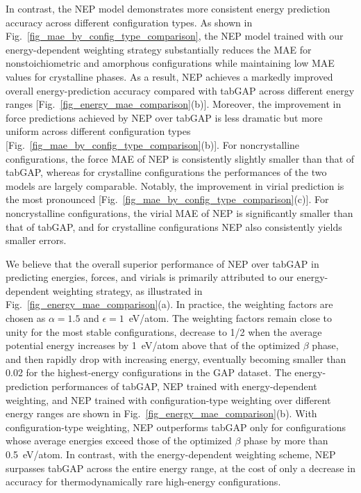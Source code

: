 \documentclass[aip,graphicx,amsmath,amssymb]{revtex4-1}
\begin{document}
In contrast, the NEP model demonstrates more consistent energy prediction accuracy
across different configuration types.
As shown in Fig.~\ref{fig_mae_by_config_type_comparison}, the NEP model trained with our 
energy-dependent weighting strategy 
substantially reduces the MAE for nonstoichiometric and amorphous
configurations while maintaining low MAE values for crystalline phases.
As a result, NEP achieves a markedly improved overall energy-prediction accuracy compared with
tabGAP across different energy ranges
[Fig.~\ref{fig_energy_mae_comparison}(b)].
Moreover, the improvement in force predictions achieved by NEP over tabGAP is less dramatic
but more uniform across different configuration types
[Fig.~\ref{fig_mae_by_config_type_comparison}(b)].
For noncrystalline configurations, the force MAE of NEP is consistently slightly smaller
than that of tabGAP, whereas for crystalline configurations the performances of the two
models are largely comparable.
Notably, the improvement in virial prediction is the most pronounced
[Fig.~\ref{fig_mae_by_config_type_comparison}(c)].
For noncrystalline configurations, the virial MAE of NEP is significantly smaller than that
of tabGAP, and for crystalline configurations NEP also consistently yields smaller errors.

We believe that the overall superior performance of NEP over tabGAP in predicting energies,
forces, and virials is primarily attributed to our energy-dependent weighting strategy,
as illustrated in Fig.~\ref{fig_energy_mae_comparison}(a).
In practice, the weighting factors are chosen as $\alpha = 1.5$ and $\epsilon = 1$~eV/atom.
The weighting factors remain close to unity for the most stable configurations, decrease
to 1/2 when the average potential energy increases by 1~eV/atom above that of the
optimized $\beta$ phase, and then rapidly drop with increasing energy, eventually becoming
smaller than 0.02 for the highest-energy configurations in the GAP dataset.
The energy-prediction performances of tabGAP, NEP trained with energy-dependent weighting,
and NEP trained with configuration-type weighting over different energy ranges are shown in
Fig.~\ref{fig_energy_mae_comparison}(b).
With configuration-type weighting, NEP outperforms tabGAP only for configurations whose
average energies exceed those of the optimized $\beta$ phase by more than 0.5~eV/atom.
In contrast, with the energy-dependent weighting scheme, NEP surpasses tabGAP across the
entire energy range, at the cost of only a decrease in accuracy for 
thermodynamically rare high-energy configurations.
\end{document}
